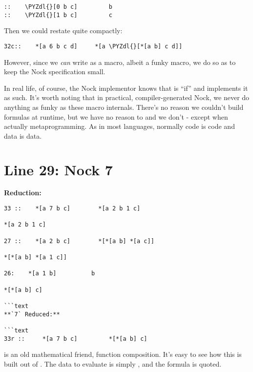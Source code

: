 \begin{framed_shaded}
\begin{Verbatim}[fontsize=\relsize{-2.5},fontseries=b,commandchars=\\\{\}]
::    \PYZdl{}[0 b c]         b
::    \PYZdl{}[1 b c]         c
\end{Verbatim}
\end{framed_shaded}
Then we could restate  quite compactly:

\begin{framed_shaded}
\begin{Verbatim}[fontsize=\relsize{-2.5},fontseries=b,commandchars=\\\{\}]
32c::    *[a 6 b c d]     *[a \PYZdl{}[*[a b] c d]]
\end{Verbatim}
\end{framed_shaded}

However, since we \emph{can} write  as a macro, albeit a funky macro, we do so
as to keep the Nock specification small.

In real life, of course, the Nock implementor knows that  is ``if'' and
implements it as such. It's worth noting that in practical, compiler-generated
Nock, we never do anything as funky as these  macro internals.  There's no
reason we couldn't build formulas at runtime, but we have no reason to and we
don't - except when actually metaprogramming.  As in most languages, normally
code is code and data is data.

\section{Line 29: Nock 7}

\textbf{ Reduction:}

\begin{framed_shaded}
\begin{Verbatim}[fontsize=\relsize{-2.5},fontseries=b,commandchars=\\\{\}]
33 ::    *[a 7 b c]        *[a 2 b 1 c]

*[a 2 b 1 c]

27 ::    *[a 2 b c]        *[*[a b] *[a c]] 

*[*[a b] *[a 1 c]]

26:    *[a 1 b]          b
 
*[*[a b] c]
 
```text
**`7` Reduced:**

```text
33r ::     *[a 7 b c]         *[*[a b] c]
\end{Verbatim}
\end{framed_shaded}
 is an old mathematical friend, function composition.  It's
easy to see how this is built out of .  The data to evaluate
is simply , and the formula is  quoted.


